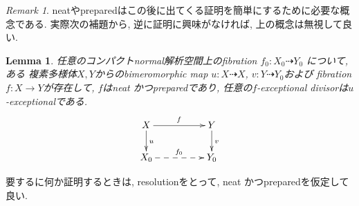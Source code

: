 \documentclass[dvipdfmx,a4paper,11pt]{article} %
\newtheorem{lem}[thm]{Lemma}
\theoremstyle{definition}
\theoremstyle{remark}
\newtheorem{rem}[thm]{Remark}
\numberwithin{equation}{section}
\begin{document}
\begin{rem}
neatやpreparedはこの後に出てくる証明を簡単にするために必要な概念である. 
実際次の補題から, 
逆に証明に興味がなければ, 上の概念は無視して良い.
\end{rem}

\begin{lem}\cite[Lemma 1.3]{Cam04}
\label{lem-Cam04-1.3}
任意のコンパクトnormal解析空間上のfibration \(f_0 : X_0 \dashrightarrow Y_0\) について, ある
複素多様体$X, Y$からのbimeromorphic map $u : X \dashrightarrow X$, $v: Y \dashrightarrow Y_0$および 
fibration $f : X \to Y$が存在して, $f$はneat かつpreparedであり, 
任意の$f$-exceptional divisorは$u$-exceptionalである. 
  \[
\xymatrix@C=50pt@R=20pt{
X  \ar@{->}[d]^{u}\ar@{->}[r]^{f} &Y \ar@{->}[d]^{v}\\
 X_0\ar@{-->}[r]^{f_0} & Y_0\\
}
\]
\end{lem}
要するに何か証明するときは, resolutionをとって, neat かつpreparedを仮定して良い. 
\end{document}

